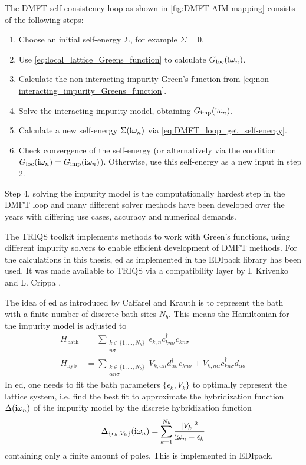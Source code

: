 \documentclass[../notes.tex]{subfiles}
\begin{document}
The DMFT self-consistency loop as shown in \cref{fig:DMFT AIM mapping} consists of the following steps:
\begin{enumerate}
	\item Choose an initial self-energy \(\Sigma\), for example \(\Sigma = 0\).
	\item Use \cref{eq:local_lattice_Greens_function} to calculate \(G_{\mathrm{loc}} (\mathrm{i} \omega_n)\).
	\item Calculate the non-interacting impurity Green's function from \cref{eq:non-interacting_impurity_Greens_function}.
	\item Solve the interacting impurity model, obtaining \(G_{\mathrm{imp}} (\mathrm{i} \omega_n)\).
	\item Calculate a new self-energy \(\Sigma (\mathrm{i} \omega_n)\) via \cref{eq:DMFT_loop_get_self-energy}.
	\item Check convergence of the self-energy (or alternatively via the condition \(G_{\mathrm{loc}} (\mathrm{i} \omega_n) = G_{\mathrm{imp}} (\mathrm{i} \omega_n)\)). Otherwise, use this self-energy as a new input in step 2.
\end{enumerate}
Step 4, solving the impurity model is the computationally hardest step in the DMFT loop and many different solver methods have been developed over the years with differing use cases, accuracy and numerical demands.

The TRIQS toolkit \cite{parcolletTRIQSToolboxResearch2015} implements methods to work with Green's functions, using different impurity solvers to enable efficient development of DMFT methods.
For the calculations in this thesis, \acrfull{ed} as implemented in the EDIpack library \cite{amaricciEDIpackParallelExact2022} has been used.
It was made available to TRIQS via a compatibility layer by I. Krivenko and L. Crippa \cite{krivenkoKrivenkoEdipack2triqs2025}.

The idea of \acrshort{ed} as introduced by Caffarel and Krauth \cite{caffarelExactDiagonalizationApproach1994} is to represent the bath with a finite number of discrete bath sites \(N_b\).
This means the Hamiltonian for the impurity model is adjusted to
\begin{align}
	H_{\mathrm{bath}} &= \sum_{\substack{k \in \{1, \ldots, N_b\} \\ n \sigma}} \epsilon_{k, n} c_{k n \sigma}^{\dagger} c_{k n \sigma}  \\
	H_{\mathrm{hyb}} &= \sum_{\substack{k \in \{1, \ldots, N_b\} \\ \alpha n \sigma}} V_{k, \alpha n} d_{\alpha \sigma}^{\dagger} c_{k n \sigma} + V_{k, n \alpha} c_{k n \sigma}^{\dagger} d_{\alpha \sigma}
\end{align}
In \acrshort{ed}, one needs to fit the bath parameters \(\{\epsilon_k, V_k\}\) to optimally represent the lattice system, i.e. find the best fit to approximate the hybridization function \(\Delta (\mathrm{i} \omega_n)\) of the impurity model by the discrete hybridization function
\begin{equation}
	\Delta_{\{\epsilon_k, V_k\}} (\mathrm{i} \omega_n) = \sum_{k=1}^{N_b} \frac{\vert V_k \vert^2}{\mathrm{i} \omega_n - \epsilon_k}
\end{equation}
containing only a finite amount of poles.
This is implemented in EDIpack.
\end{document}
